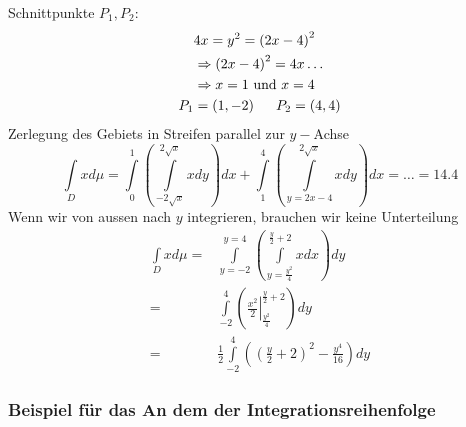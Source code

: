 \begin{enumerate}
Schnittpunkte $P_1,P_2$:
\begin{align*}
&4x=y^2=\left( 2x-4\right)^2\\
&\Rightarrow\left( 2x-4\right)^2=4x\dots\\
&\Rightarrow x=1 \text{ und } x=4\\
P_1&=\left(1,-2\right)\hspace{5mm}P_2=\left(4,4\right)
\end{align*}
Zerlegung des Gebiets in Streifen parallel zur $y-$Achse
\[\int\limits_D {xd\mu  = \int\limits_0^1 {\left( {\int\limits_{ - 2\sqrt x }^{2\sqrt x } {xdy} } \right)dx} }  + \int\limits_1^4 {\left( {\int\limits_{y = 2x - 4}^{2\sqrt x } {xdy} } \right)} dx =  \ldots  = 14.4\]
Wenn wir von aussen nach $y$ integrieren, brauchen wir keine Unterteilung
\begin{align*}
\int\limits_D xd\mu  =&\int\limits_{y =  - 2}^{y = 4} {\left( {\int\limits_{y = \frac{{{y^2}}}{4}}^{\frac{y}{2} + 2} {xdx} }\right)dy} \\
 =&\int\limits_{ - 2}^4 {\left( {\left. {\frac{{{x^2}}}{2}} \right|_{\frac{{{y^2}}}{4}}^{\frac{y}{2} + 2}} \right)dy}\\
=&\frac{1}{2}\int\limits_{ - 2}^4 {\left( {{{\left( {\frac{y}{2} + 2} \right)}^2} - \frac{{{y^4}}}{{16}}} \right)dy}
\end{align*}
\end{enumerate}

\subsubsection*{Beispiel für das An dem der Integrationsreihenfolge}
